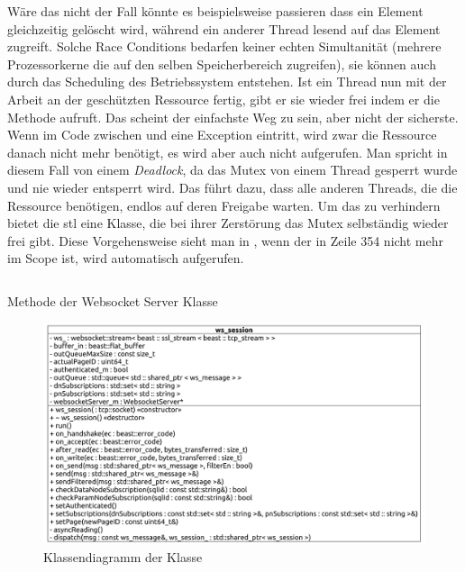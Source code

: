 Wäre das nicht der Fall könnte es beispielsweise passieren dass ein Element gleichzeitig gelöscht wird, während ein anderer Thread lesend auf das Element zugreift.
Solche Race Conditions bedarfen keiner echten Simultanität (mehrere Prozessorkerne die auf den selben Speicherbereich zugreifen), sie können auch durch das Scheduling des Betriebssystem entstehen. 
Ist ein Thread nun mit der Arbeit an der geschützten Ressource fertig, gibt er sie wieder frei indem er die Methode  aufruft.
Das scheint der einfachste Weg zu sein, aber nicht der sicherste. 
Wenn im Code zwischen  und  eine Exception eintritt, 
wird zwar die Ressource danach nicht mehr benötigt, es wird aber auch nicht  aufgerufen.
Man spricht in diesem Fall von einem \emph{Deadlock}, da das Mutex von einem Thread gesperrt wurde und nie wieder entsperrt wird. 
Das führt dazu, dass alle anderen Threads, die die Ressource benötigen, endlos auf deren Freigabe warten. 
Um das zu verhindern bietet die \ac{stl} eine  Klasse, die bei ihrer Zerstörung das Mutex selbständig wieder frei gibt.
Diese Vorgehensweise sieht man in , wenn der  in Zeile 354 nicht mehr im Scope ist, wird automatisch  aufgerufen.
\begin{listing}[ht]
  \inputminted[linenos=true,breaklines=true, firstline=348, lastline=354]{c++}{../Backend/WebsocketServer.cpp}
  \caption{Methode  der Websocket Server Klasse}
  \label{list:addSession}
\end{listing}
\begin{figure}[ht]
  \centering
  \includegraphics[width=\textwidth]{content/hauptteil/umsetzungPoC/backend/uml/classesOfOverview/ws_session.pdf}
  \caption{Klassendiagramm der Klasse }
  \label{fig:backend:classDiag:wsSession}
\end{figure}
